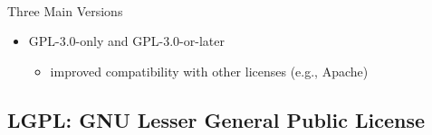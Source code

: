 \begin{frame}{\insertsubsection\ }
\begin{fancycolumns}
\begin{note}{Three Main Versions}
\begin{itemize}
\begin{itemize}
					      \item fixed above problems
					      \item relaxed version LGPL, motivated by C standard library (libc)
				      \end{itemize}
				\item GPL-3.0-only and GPL-3.0-or-later
				      \begin{itemize}
					      \item improved compatibility with other licenses (e.g., Apache)
				      \end{itemize}
			\end{itemize}
		\end{note}
	\end{fancycolumns}
\end{frame}

\subsection{LGPL: GNU Lesser General Public License}
